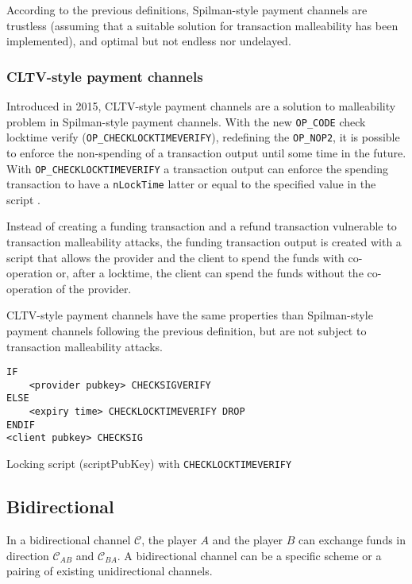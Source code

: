 According to the previous definitions, Spilman-style payment channels are trustless
(assuming that a suitable solution for transaction malleability has been implemented),
and optimal but not endless nor undelayed.

\subsubsection{CLTV-style payment channels}

Introduced in 2015, CLTV-style payment channels are a solution to malleability problem
in Spilman-style payment channels. With the new \texttt{OP\_CODE} check locktime verify
(\texttt{OP\_CHECKLOCKTIMEVERIFY}), redefining the \texttt{OP\_NOP2}, it is possible to
enforce the non-spending of a transaction output until some time in the future. With
\texttt{OP\_CHECKLOCKTIMEVERIFY} a transaction output can enforce the spending transaction
to have a \texttt{nLockTime} latter or equal to the specified value in the script \cite{BIP65}.

Instead of creating a funding transaction and a refund transaction vulnerable to
transaction malleability attacks, the funding transaction output is created with a
script that allows the provider and the client to spend the funds with co-operation or,
after a locktime, the client can spend the funds without the co-operation of the
provider.

CLTV-style payment channels have the same properties than Spilman-style payment channels
following the previous definition, but are not subject to transaction malleability attacks.

\begin{listing}
  \begin{verbatim}
IF
    <provider pubkey> CHECKSIGVERIFY
ELSE
    <expiry time> CHECKLOCKTIMEVERIFY DROP
ENDIF
<client pubkey> CHECKSIG
  \end{verbatim}
	\caption{Locking script (scriptPubKey) with \texttt{CHECKLOCKTIMEVERIFY}}
	\label{lst:scriptPubKeyCLTV}
\end{listing}

\subsection{Bidirectional}

In a bidirectional channel $\mathcal{C}$, the player $A$ and the player $B$ can exchange
funds in direction $\mathcal{C}_{AB}$ and $\mathcal{C}_{BA}$. A bidirectional channel
can be a specific scheme or a pairing of existing unidirectional channels.

